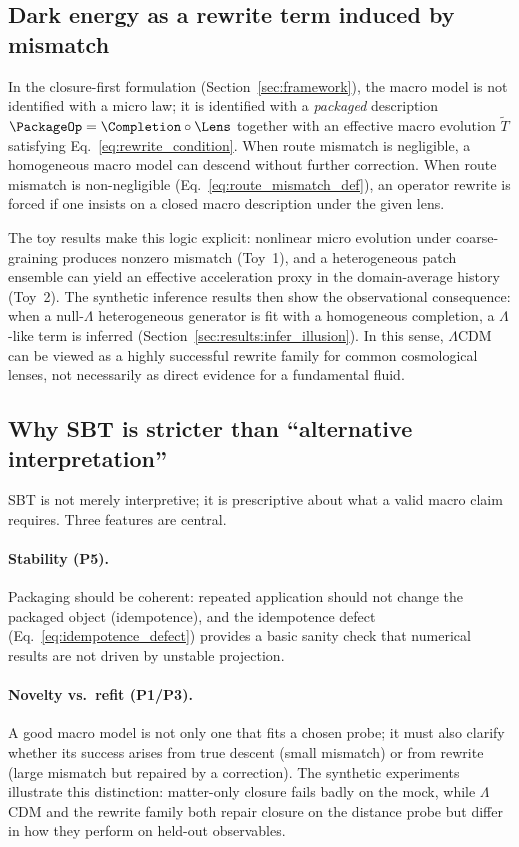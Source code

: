 \documentclass[11pt]{article}
\theoremstyle{definition}
\theoremstyle{plain}
\theoremstyle{remark}
\begin{document}
\subsection{Dark energy as a rewrite term induced by mismatch}\label{sec:discussion:rewrite}
In the closure-first formulation (Section~\ref{sec:framework}), the macro model is not identified with a micro law; it is identified with a \emph{packaged} description $\PackageOp = \Completion\circ\Lens$ together with an effective macro evolution $\widetilde{T}$ satisfying Eq.~\eqref{eq:rewrite_condition}. When route mismatch is negligible, a homogeneous macro model can descend without further correction. When route mismatch is non-negligible (Eq.~\eqref{eq:route_mismatch_def}), an operator rewrite is forced if one insists on a closed macro description under the given lens.

The toy results make this logic explicit: nonlinear micro evolution under coarse-graining produces nonzero mismatch (Toy~1), and a heterogeneous patch ensemble can yield an effective acceleration proxy in the domain-average history (Toy~2). The synthetic inference results then show the observational consequence: when a null-$\Lambda$ heterogeneous generator is fit with a homogeneous completion, a $\Lambda$-like term is inferred (Section~\ref{sec:results:infer_illusion}). In this sense, $\Lambda$CDM can be viewed as a highly successful rewrite family for common cosmological lenses, not necessarily as direct evidence for a fundamental fluid.

\subsection{Why SBT is stricter than ``alternative interpretation''}\label{sec:discussion:stricter}
SBT is not merely interpretive; it is prescriptive about what a valid macro claim requires.
Three features are central.

\paragraph{Stability (P5).}
Packaging should be coherent: repeated application should not change the packaged object (idempotence), and the idempotence defect (Eq.~\eqref{eq:idempotence_defect}) provides a basic sanity check that numerical results are not driven by unstable projection.

\paragraph{Novelty vs.\ refit (P1/P3).}
A good macro model is not only one that fits a chosen probe; it must also clarify whether its success arises from true descent (small mismatch) or from rewrite (large mismatch but repaired by a correction).
The synthetic experiments illustrate this distinction: matter-only closure fails badly on the mock, while $\Lambda$CDM and the rewrite family both repair closure on the distance probe but differ in how they perform on held-out observables.
\end{document}
